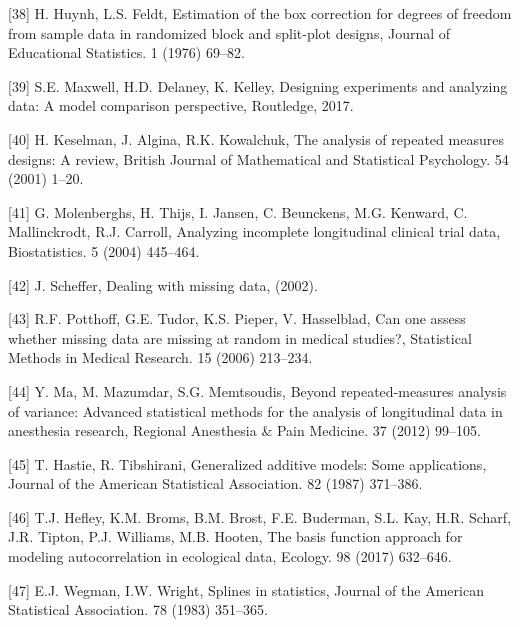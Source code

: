 \documentclass[
]{article}
\begin{document}
\leavevmode\hypertarget{ref-huynh1976}{}%
{[}38{]} H. Huynh, L.S. Feldt, Estimation of the box correction for degrees of freedom from sample data in randomized block and split-plot designs, Journal of Educational Statistics. 1 (1976) 69--82.

\leavevmode\hypertarget{ref-maxwell2017}{}%
{[}39{]} S.E. Maxwell, H.D. Delaney, K. Kelley, Designing experiments and analyzing data: A model comparison perspective, Routledge, 2017.

\leavevmode\hypertarget{ref-keselman2001}{}%
{[}40{]} H. Keselman, J. Algina, R.K. Kowalchuk, The analysis of repeated measures designs: A review, British Journal of Mathematical and Statistical Psychology. 54 (2001) 1--20.

\leavevmode\hypertarget{ref-molenberghs2004}{}%
{[}41{]} G. Molenberghs, H. Thijs, I. Jansen, C. Beunckens, M.G. Kenward, C. Mallinckrodt, R.J. Carroll, Analyzing incomplete longitudinal clinical trial data, Biostatistics. 5 (2004) 445--464.

\leavevmode\hypertarget{ref-scheffer2002}{}%
{[}42{]} J. Scheffer, Dealing with missing data, (2002).

\leavevmode\hypertarget{ref-potthoff2006}{}%
{[}43{]} R.F. Potthoff, G.E. Tudor, K.S. Pieper, V. Hasselblad, Can one assess whether missing data are missing at random in medical studies?, Statistical Methods in Medical Research. 15 (2006) 213--234.

\leavevmode\hypertarget{ref-ma2012}{}%
{[}44{]} Y. Ma, M. Mazumdar, S.G. Memtsoudis, Beyond repeated-measures analysis of variance: Advanced statistical methods for the analysis of longitudinal data in anesthesia research, Regional Anesthesia \& Pain Medicine. 37 (2012) 99--105.

\leavevmode\hypertarget{ref-hastie1987}{}%
{[}45{]} T. Hastie, R. Tibshirani, Generalized additive models: Some applications, Journal of the American Statistical Association. 82 (1987) 371--386.

\leavevmode\hypertarget{ref-hefley2017}{}%
{[}46{]} T.J. Hefley, K.M. Broms, B.M. Brost, F.E. Buderman, S.L. Kay, H.R. Scharf, J.R. Tipton, P.J. Williams, M.B. Hooten, The basis function approach for modeling autocorrelation in ecological data, Ecology. 98 (2017) 632--646.

\leavevmode\hypertarget{ref-wegman1983}{}%
{[}47{]} E.J. Wegman, I.W. Wright, Splines in statistics, Journal of the American Statistical Association. 78 (1983) 351--365.
\end{document}
